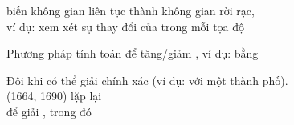 \documentclass{article}
\begin{document}
\begin{huge}
 biến không gian liên tục thành không gian rời rạc,\\
ví dụ:  xem xét sự thay đổi của \mat{$\pm \delta$} trong mỗi tọa độ

Phương pháp tính toán  
\mat{\[
 \nabla f=\left(
  \frac{\partial f}{\partial x_1},\frac{\partial f}{\partial y_1},
  \frac{\partial f}{\partial x_2},\frac{\partial f}{\partial y_2},
  \frac{\partial f}{\partial x_3},\frac{\partial f}{\partial y_3}
 \right)
\]}
để tăng/giảm , ví dụ: bằng 

Đôi khi có thể giải chính xác  (ví dụ: với một thành phố).\\
 (1664, 1690) lặp lại 
\\
để giải , trong đó 

\end{huge}
\end{document}
